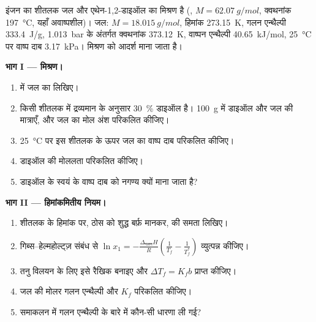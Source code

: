 \begin{problem}
\label{pb:b2:chemical-potential:1}
इंजन का शीतलक जल और एथेन-1,2-डाइऑल का मिश्रण है
(, $M = \qty{62.07}{g/mol}$, क्वथनांक \qty{197}{\celsius},
यहाँ अवाष्पशील)। जल: $M = \qty{18.015}{g/mol}$, हिमांक
\qty{273.15}{K}, गलन एन्थैल्पी \qty{333.4}{J/g}, \qty{1.013}{bar} के अंतर्गत क्वथनांक
\qty{373.12}{K}, वाष्पन एन्थैल्पी
\qty{40.65}{kJ/mol}, \qty{25}{\celsius} पर वाष्प दाब \qty{3.17}{kPa}।
मिश्रण को आदर्श माना जाता है।

\medskip
\noindent\textbf{भाग I --- मिश्रण।}
\begin{enumerate}
  \item {} में जल का  लिखिए।
  \item किसी शीतलक में द्रव्यमान के अनुसार \qty{30}{\percent} डाइऑल है।
        \qty{100}{g} में डाइऑल और जल की मात्राएँ, और जल का मोल अंश
        परिकलित कीजिए।
  \item \qty{25}{\celsius} पर इस शीतलक के ऊपर जल का वाष्प दाब
        परिकलित कीजिए।
  \item डाइऑल की मोललता परिकलित कीजिए।
  \item डाइऑल के स्वयं के वाष्प दाब को नगण्य क्यों माना जाता है?
\end{enumerate}

\medskip
\noindent\textbf{भाग II --- हिमांकमितीय नियम।}
\begin{enumerate}[resume]
  \item शीतलक के हिमांक पर, ठोस को शुद्ध बर्फ़ मानकर,  की
        समता लिखिए।
  \item गिब्स--हेल्महोल्ट्ज़ संबंध से $\ln x_1 =
        -\frac{\Delta_{\text{गलन}}H}{R}\left(\frac1{T_f} - \frac1{T_f^*}\right)$ व्युत्पन्न कीजिए।
  \item तनु विलयन के लिए इसे रैखिक बनाइए और $\Delta T_f = K_f b$ प्राप्त कीजिए।
  \item जल की मोलर गलन एन्थैल्पी और $K_f$ परिकलित कीजिए।
  \item समाकलन में गलन एन्थैल्पी के बारे में कौन-सी धारणा
        ली गई?
\end{enumerate}


\end{problem}

